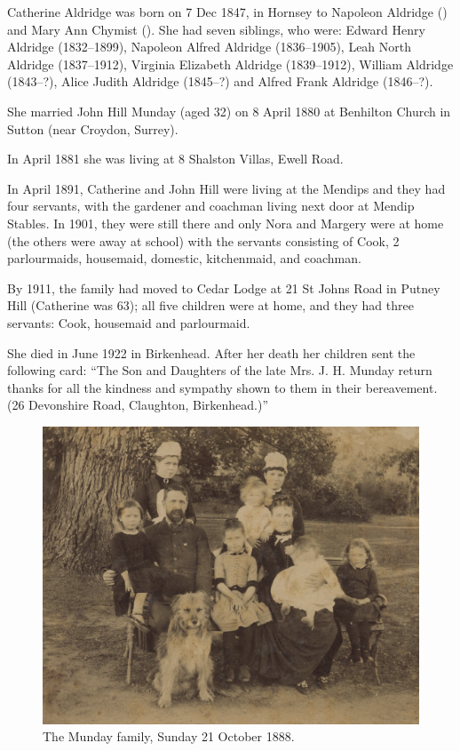 
Catherine Aldridge was born on 7 Dec 1847, in Hornsey \cite{JHMtree, 1881censusKingston} to Napoleon Aldridge () and Mary Ann Chymist ().  She had seven siblings, who were: Edward Henry Aldridge (1832--1899), Napoleon Alfred Aldridge (1836--1905), Leah North Aldridge (1837--1912), Virginia Elizabeth Aldridge (1839--1912), William Aldridge (1843--?), Alice Judith Aldridge (1845--?) and Alfred Frank Aldridge (1846--?).

She married John Hill Munday (aged 32) on 8 April 1880\cite{JHM-CA-marriage} at Benhilton Church in Sutton (near Croydon, Surrey).\cite{JHM-CA-marriage, JHM-CA-marriage-announcement}

In April 1881 she was living at 8 Shalston Villas, Ewell Road.\cite{1881censusKingston}

In April 1891, Catherine and John Hill were living at the Mendips and they had four servants, with the gardener and coachman living next door at Mendip Stables.\cite{1891census} In 1901, they were still there and only Nora and Margery were at home (the others were away at school) with the servants consisting of Cook, 2 parlourmaids, housemaid, domestic, kitchenmaid, and coachman.\cite{1901censusMendips}

By 1911, the family had moved to Cedar Lodge at 21 St Johns Road in Putney Hill (Catherine was 63); all five children were at home, and they had three servants: Cook, housemaid and parlourmaid.\cite{1911censusWandsworth}

She died in June 1922 in Birkenhead.\cite{FreeBMD-CA} After her death her children sent the following card: ``The Son and Daughters of the late Mrs. J. H. Munday return thanks for all the kindness and sympathy shown to them in their bereavement. (26 Devonshire Road, Claughton, Birkenhead.)''\cite{CA-bereavement-card}

\begin{figure}
	\centering
	\includegraphics{photos/JH_Munday_and_family_1888.png}
	\caption{The Munday family, Sunday 21 October 1888.}
\end{figure}

